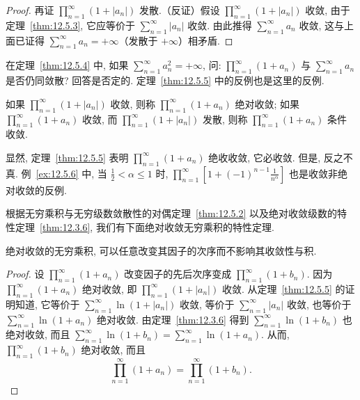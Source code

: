 \begin{proof}
再证 $\prod_{n=1}^{\infty}(1+|a_{n}|)$ 发散.（反证）假设 $\prod_{n=1}^{\infty}(1+|a_{n}|)$ 收敛, 由于定理~\ref{thm:12.5.3}, 它应等价于 $\sum_{n=1}^{\infty}|a_{n}|$ 收敛. 由此推得 $\sum_{n=1}^{\infty}a_{n}$ 收敛, 这与上面已证得 $\sum_{n=1}^{\infty}a_{n}=+\infty$（发散于 $+\infty$）相矛盾.
\end{proof}

\begin{example}\label{ex:12.5.2}
在定理~\ref{thm:12.5.4} 中, 如果 $\sum_{n=1}^{\infty}a_{n}^{2}=+\infty$, 问: $\prod_{n=1}^{\infty}(1+a_{n})$ 与 $\sum_{n=1}^{\infty}a_{n}$ 是否仍同敛散? 回答是否定的. 定理~\ref{thm:12.5.5} 中的反例也是这里的反例.
\end{example}

\begin{definition}\label{def:12.5.2}
如果 $\prod_{n=1}^{\infty}(1+|a_{n}|)$ 收敛, 则称 $\prod_{n=1}^{\infty}(1+a_{n})$ 绝对收敛; 如果 $\prod_{n=1}^{\infty}(1+a_{n})$ 收敛, 而 $\prod_{n=1}^{\infty}(1+|a_{n}|)$ 发散, 则称 $\prod_{n=1}^{\infty}(1+a_{n})$ 条件收敛.
\end{definition}

显然, 定理~\ref{thm:12.5.5} 表明 $\prod_{n=1}^{\infty}(1+a_{n})$ 绝收收敛, 它必收敛. 但是, 反之不真. 例~\ref{ex:12.5.6} 中, 当 $\frac{1}{2}<\alpha\leqslant1$ 时, $\prod_{n=1}^{\infty}\left[1+(-1)^{n-1}\frac{1}{n^{\alpha}}\right]$ 也是收敛非绝对收敛的反例.

根据无穷乘积与无穷级数敛散性的对偶定理~\ref{thm:12.5.2} 以及绝对收敛级数的特性定理~\ref{thm:12.3.6}, 我们有下面绝对收敛无穷乘积的特性定理.

\begin{theorem}[绝对收敛无穷乘积的特性]\label{thm:12.5.6}
绝对收敛的无穷乘积, 可以任意改变其因子的次序而不影响其收敛性与积.
\end{theorem}

\begin{proof}
设 $\prod_{n=1}^{\infty}(1+a_{n})$ 改变因子的先后次序变成 $\prod_{n=1}^{\infty}(1+b_{n})$. 因为 $\prod_{n=1}^{\infty}(1+a_{n})$ 绝对收敛, 即 $\prod_{n=1}^{\infty}(1+|a_{n}|)$ 收敛. 从定理~\ref{thm:12.5.5} 的证明知道, 它等价于 $\sum_{n=1}^{\infty}\ln(1+|a_{n}|)$ 收敛, 等价于 $\sum_{n=1}^{\infty}|a_{n}|$ 收敛, 也等价于 $\sum_{n=1}^{\infty}\ln(1+a_{n})$ 绝对收敛. 由定理~\ref{thm:12.3.6} 得到 $\sum_{n=1}^{\infty}\ln(1+b_{n})$ 也绝对收敛, 而且 $\sum_{n=1}^{\infty}\ln(1+b_{n})=\sum_{n=1}^{\infty}\ln(1+a_{n})$. 从而, $\prod_{n=1}^{\infty}(1+b_{n})$ 绝对收敛, 而且
\[
  \prod_{n=1}^{\infty}(1+a_{n})=\prod_{n=1}^{\infty}(1+b_{n}).
\]
\end{proof}

